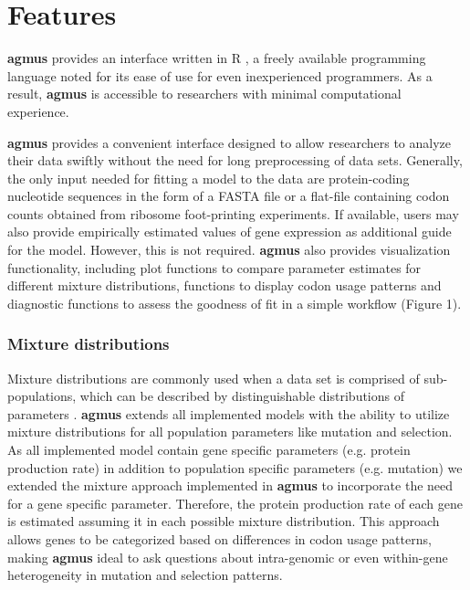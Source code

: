\documentclass{bioinfo}
\newcommand{\package}{\textbf{agmus }} %
\begin{document}
\section*{Features}
\package provides an interface written in R \citep{rcore}, a freely available programming language noted for its ease of use for even inexperienced programmers. 
As a result, \package is accessible to researchers with minimal computational experience. 

\package provides a convenient interface designed to allow researchers to analyze their data swiftly without the need for long preprocessing of data sets. 
Generally, the only input needed for fitting a model to the data are protein-coding nucleotide sequences in the form of a FASTA file or a flat-file containing codon counts obtained from ribosome foot-printing experiments. 
If available, users may also provide empirically estimated values of gene expression as additional guide for the model. However, this is not required.
\package also provides visualization functionality, including plot functions to compare parameter estimates for different mixture distributions, functions to display codon usage patterns and diagnostic functions to assess the goodness of fit in a simple workflow (Figure 1).

\subsubsection*{Mixture distributions}
Mixture distributions are commonly used when a data set is comprised of sub-populations, which can be described by distinguishable distributions of parameters \citep{gelman2013}. \package extends all implemented models with the ability to utilize mixture distributions for all population parameters like mutation and selection. As all implemented model contain gene specific parameters (e.g. protein production rate) in addition to population specific parameters (e.g. mutation) we extended the mixture approach implemented in \package to incorporate the need for a gene specific parameter. Therefore, the protein production rate of each gene is estimated assuming it in each possible mixture distribution. This approach allows genes to be categorized based on differences in codon usage patterns, making \package ideal to ask questions about intra-genomic or even within-gene heterogeneity in mutation and selection patterns. 
\end{document}
